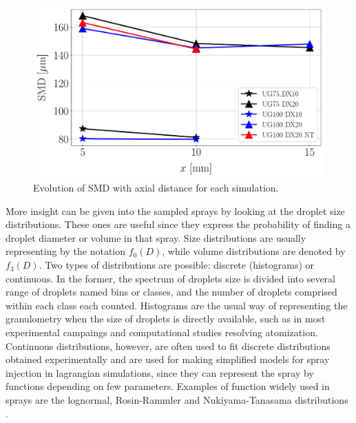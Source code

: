 \begin{figure}[ht]
\centering
   \includegraphics[scale=0.30]{./part2_developments/figures_ch5_resolved_JICF/SPRAY_characterization/SMD_values}
   \vspace*{-0.2in}
   \caption{Evolution of SMD with axial distance for each simulation.}
   \label{fig:ch5_spray_char_SMD_final}
\end{figure}



More insight can be given into the sampled sprays by looking at the droplet size distributions. These ones are useful since they express the probability of finding a droplet diameter or volume in that spray. Size distributions are usually representing by the notation $f_0 \left( D \right)$, while volume distributions are denoted by $f_3 \left( D \right)$. Two types of distributions are possible: discrete (histograms) or continuous. In the former, the spectrum of droplets size is divided into several range of droplets named bins or classes, and the number of droplets comprised within each class each counted. Histograms are the usual way of representing the granulometry when the size of droplets is directly available, such as in most experimental campaings and computational studies resolving atomization. Continuous distributions, however, are often used to fit discrete distributions obtained experimentally and are used for making simplified models for spray injection in lagrangian simulations, since they can represent the spray by functions depending on few parameters. Examples of function widely used in sprays are the lognormal, Rosin-Rammler and Nukiyama-Tanasama distributions . 

